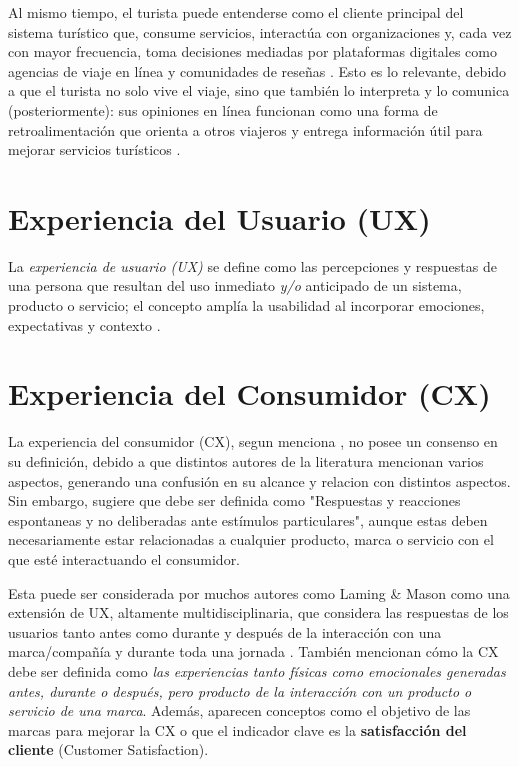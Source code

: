 Al mismo tiempo, el turista puede entenderse como el cliente principal del sistema turístico que, consume servicios, interactúa con organizaciones y, cada vez con mayor frecuencia, toma decisiones mediadas por plataformas digitales como agencias de viaje en línea y comunidades de reseñas \parencite{rusu2023holistic,ortiz2024slr}. Esto es lo relevante, debido a que el turista no solo vive el viaje, sino que también lo interpreta y lo comunica (posteriormente): sus opiniones en línea funcionan como una forma de retroalimentación que orienta a otros viajeros y entrega información útil para mejorar servicios turísticos \parencite{rusu2020hostels}.

\section{Experiencia del Usuario (UX)}
\label{sec:ux}

La \emph{experiencia de usuario (UX)} se define como las percepciones y respuestas de una persona que resultan del uso inmediato \emph{y/o} anticipado de un sistema, producto o servicio; el concepto amplía la usabilidad al incorporar emociones, expectativas y contexto \parencite{ISO9241-210:2010}.

\section{Experiencia del Consumidor (CX)}
\label{sec:cx}

La experiencia del consumidor (CX), segun menciona \parencite{becker2020customer}, no posee un consenso en su definición, debido a que distintos autores de la literatura mencionan varios aspectos, generando una confusión en su alcance y relacion con distintos aspectos. Sin embargo, sugiere que debe ser definida como "Respuestas y reacciones espontaneas y no deliberadas ante estímulos particulares", aunque estas deben necesariamente estar relacionadas a cualquier producto, marca o servicio con el que esté interactuando el consumidor.

Esta puede ser considerada por muchos autores como Laming \& Mason como una extensión de UX, altamente multidisciplinaria, que considera las respuestas de los usuarios tanto antes como durante y después de la interacción con una marca/compañía y durante toda una jornada \parencite{laming2014customer_experience}. También mencionan cómo la CX debe ser definida como \textit{las experiencias tanto físicas como emocionales generadas antes, durante o después, pero producto de la interacción con un producto o servicio de una marca}. Además, aparecen conceptos como el objetivo de las marcas para mejorar la CX o que el indicador clave es la \textbf{satisfacción del cliente} (Customer Satisfaction).

